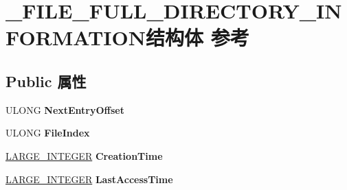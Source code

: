 \hypertarget{struct___f_i_l_e___f_u_l_l___d_i_r_e_c_t_o_r_y___i_n_f_o_r_m_a_t_i_o_n}{}\section{\+\_\+\+F\+I\+L\+E\+\_\+\+F\+U\+L\+L\+\_\+\+D\+I\+R\+E\+C\+T\+O\+R\+Y\+\_\+\+I\+N\+F\+O\+R\+M\+A\+T\+I\+O\+N结构体 参考}
\label{struct___f_i_l_e___f_u_l_l___d_i_r_e_c_t_o_r_y___i_n_f_o_r_m_a_t_i_o_n}
\subsection*{Public 属性}
\begin{DoxyCompactItemize}
\item 
\mbox{\label{struct___f_i_l_e___f_u_l_l___d_i_r_e_c_t_o_r_y___i_n_f_o_r_m_a_t_i_o_n_ae61a4d3eae23f47cd0783990b54f69ef}} 
U\+L\+O\+NG {\bfseries Next\+Entry\+Offset}
\item 
\mbox{\label{struct___f_i_l_e___f_u_l_l___d_i_r_e_c_t_o_r_y___i_n_f_o_r_m_a_t_i_o_n_a93724a3fe9f87cc9a921050bdb07d6f9}} 
U\+L\+O\+NG {\bfseries File\+Index}
\item 
\mbox{\label{struct___f_i_l_e___f_u_l_l___d_i_r_e_c_t_o_r_y___i_n_f_o_r_m_a_t_i_o_n_ae4bd9daab965445b1c9bc99dd99d094c}} 
\hyperlink{union___l_a_r_g_e___i_n_t_e_g_e_r}{L\+A\+R\+G\+E\+\_\+\+I\+N\+T\+E\+G\+ER} {\bfseries Creation\+Time}
\item 
\mbox{\label{struct___f_i_l_e___f_u_l_l___d_i_r_e_c_t_o_r_y___i_n_f_o_r_m_a_t_i_o_n_a315fbc79dd812b19ab699884e4799620}} 
\hyperlink{union___l_a_r_g_e___i_n_t_e_g_e_r}{L\+A\+R\+G\+E\+\_\+\+I\+N\+T\+E\+G\+ER} {\bfseries Last\+Access\+Time}
\item 
\mbox{\label{struct___f_i_l_e___f_u_l_l___d_i_r_e_c_t_o_r_y___i_n_f_o_r_m_a_t_i_o_n_a467fef6d8d75129b647b6868e577f9f7}} 

\end{DoxyCompactItemize}
